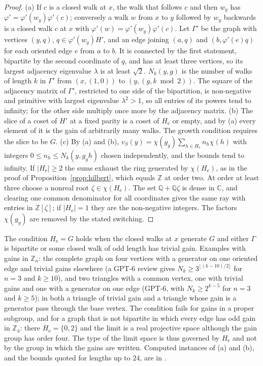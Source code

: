 \begin{proof}
(a) If $c$ is a closed walk at $x$, the walk that follows $c$ and then $w_y$ has $\varphi'=\varphi'(w_y)\varphi'(c)$; conversely a walk $w$ from $x$ to $y$ followed by $w_y$ backwards is a closed walk $c$ at $x$ with $\varphi'(w)=\varphi'(w_y)\varphi'(c)$. Let $\Gamma'$ be the graph with vertices $(y,q)$, $q\in\varphi'(w_y)H'$, and an edge joining $(a,q)$ and $(b,\varphi'(e)q)$ for each oriented edge $e$ from $a$ to $b$. It is connected by the first statement, bipartite by the second coordinate of $q$, and has at least three vertices, so its largest adjacency eigenvalue $\lambda$ is at least $\sqrt2$. $N_k(y,g)$ is the number of walks of length $k$ in $\Gamma'$ from $(x,(1,0))$ to $(y,(g,k\bmod2))$. The square of the adjacency matrix of $\Gamma'$, restricted to one side of the bipartition, is non-negative and primitive with largest eigenvalue $\lambda^2>1$, so all entries of its powers tend to infinity; for the other side multiply once more by the adjacency matrix. (b) The slice of a coset of $H'$ at a fixed parity is a coset of $H_{\mathrm e}$ or empty, and by (a) every element of it is the gain of arbitrarily many walks. The growth condition requires the slice to be $G$. (c) By (a) and (b), $v_S(y)=\chi(g_y)\sum_{h\in H_{\mathrm e}}n_h\chi(h)$ with integers $0\le n_h\le N_k(y,g_yh)$ chosen independently, and the bounds tend to infinity. If $|H_{\mathrm e}|\ge2$ the sums exhaust the ring generated by $\chi(H_{\mathrm e})$, as in the proof of Proposition~\ref{prop:hilbert}, which equals $\mathbb{Z}$ at order two. At order at least three choose a nonreal root $\zeta\in\chi(H_{\mathrm e})$. The set $\mathbb{Q}+\mathbb{Q}\zeta$ is dense in $\mathbb{C}$, and clearing one common denominator for all coordinates gives the same ray with entries in $\mathbb{Z}[\zeta]$; if $|H_{\mathrm e}|=1$ they are the non-negative integers. The factors $\chi(g_y)$ are removed by the stated switching.
\end{proof}

The condition $H_{\mathrm e}=G$ holds when the closed walks at $x$ generate $G$ and either $\Gamma$ is bipartite or some closed walk of odd length has trivial gain. Examples with gains in $\mathbb{Z}_n$: the complete graph on four vertices with a generator on one oriented edge and trivial gains elsewhere (a GPT-6 review gives $N_k\ge3^{\lfloor(k-10)/2\rfloor}$ for $n=3$ and $k\ge10$), and two triangles with a common vertex, one with trivial gains and one with a generator on one edge (GPT-6, with $N_k\ge2^{k-5}$ for $n=3$ and $k\ge5$); in both a triangle of trivial gain and a triangle whose gain is a generator pass through the base vertex. The condition fails for gains in a proper subgroup, and for a graph that is not bipartite in which every edge has odd gain in $\mathbb{Z}_4$: there $H_{\mathrm e}=\{0,2\}$ and the limit is a real projective space although the gain group has order four. The type of the limit space is thus governed by $H_{\mathrm e}$ and not by the group in which the gains are written. Computed instances of (a) and (b), and the bounds quoted for lengths up to $24$, are in \cite{comp4}.

